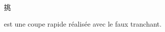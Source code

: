 \section{\Tiao}
\Tiao{} \begin{CJK*}{UTF8}{bsmi}挑\end{CJK*} est une coupe rapide réalisée avec le faux tranchant.
